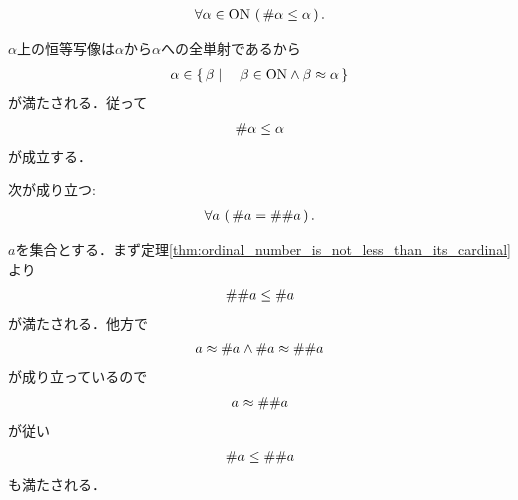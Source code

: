 	
	
	
	\begin{screen}
		\begin{thm}[順序数はその濃度より小さくない]\label{thm:ordinal_number_is_not_less_than_its_cardinal}
			\begin{align}
				\forall \alpha \in \mathrm{ON}\, \left(\, \# \alpha \leq \alpha\, \right).
			\end{align}
		\end{thm}
	\end{screen}
	
	\begin{sketch}
		$\alpha$上の恒等写像は$\alpha$から$\alpha$への全単射であるから
		\begin{align}
			\alpha \in \left\{\, \beta \mid \quad \beta \in \mathrm{ON} \wedge \beta \approx \alpha\, \right\}
		\end{align}
		が満たされる．従って
		\begin{align}
			\# \alpha \leq \alpha
		\end{align}
		が成立する．
		\QED
	\end{sketch}
	
	\begin{screen}
		\begin{thm}[濃度は基数]\label{thm:cardinal_is_cardinal_number}
			次が成り立つ:
			\begin{align}
				\forall a\, \left(\, \# a = \# \# a\, \right).
			\end{align}
		\end{thm}
	\end{screen}
	
	\begin{sketch}
		$a$を集合とする．まず定理\ref{thm:ordinal_number_is_not_less_than_its_cardinal}より
		\begin{align}
			\# \# a \leq \# a
		\end{align}
		が満たされる．他方で
		\begin{align}
			a \approx \# a \wedge \# a \approx \# \# a
		\end{align}
		が成り立っているので
		\begin{align}
			a \approx \# \# a
		\end{align}
		が従い
		\begin{align}
			\# a \leq \# \# a
		\end{align}
		も満たされる．
		\QED
	\end{sketch}
	
